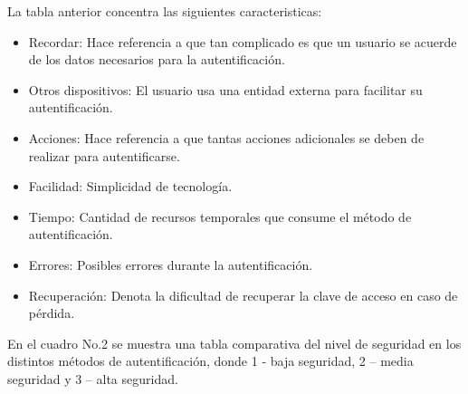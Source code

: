 \documentclass[12pt, a4paper, titlepage]{article}
\begin{document}
			La tabla anterior concentra las siguientes caracteristicas:
			
			\begin{itemize}
				\item Recordar: Hace referencia a que tan complicado es que un usuario se acuerde de los datos necesarios para la autentificación. 
				\item Otros dispositivos: El usuario usa una entidad externa para facilitar su autentificación.
				\item Acciones: Hace referencia a que tantas acciones adicionales se deben de realizar para autentificarse.
				\item Facilidad: Simplicidad de tecnología.
				\item Tiempo: Cantidad de recursos temporales que consume el método de autentificación.
				\item Errores: Posibles errores durante la autentificación. 
				\item Recuperación: Denota la dificultad de recuperar la clave de acceso en caso de pérdida.
			\end{itemize}
				
			En el cuadro No.2 se muestra una tabla comparativa del nivel de seguridad en los distintos métodos de autentificación, donde 1 - baja seguridad, 2 – media seguridad y 3 – alta seguridad.
			
\end{document}
